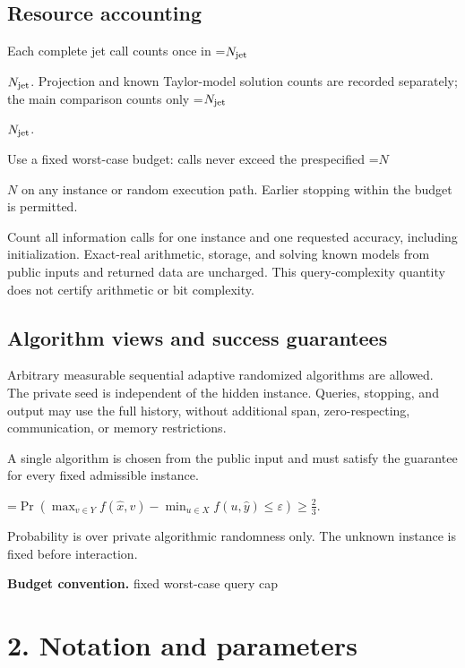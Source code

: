 \documentclass[10pt,a4paper]{article}
\newcommand{\AtlasMath}[1]{\par\begingroup\centering\setbox0=\hbox{$\displaystyle #1$}\ifdim\wd0>1.4\linewidth\typeout{ATLAS WIDE FORMULA: \the\wd0}\fi\ifdim\wd0>\linewidth\resizebox{\linewidth}{!}{\box0}\else\box0\fi\par\endgroup}
\newcommand{\AtlasInlineMath}[1]{\begingroup\setbox0=\hbox{$#1$}\ifdim\wd0>.4\linewidth\endgroup\AtlasMath{#1}\else\endgroup$#1$\fi}
\begin{document}
\subsection{Resource accounting}


Each complete jet call counts once in \AtlasInlineMath{N_{\rm jet}}. Projection and known Taylor-model solution counts are recorded separately; the main comparison counts only \AtlasInlineMath{N_{\rm jet}}.



Use a fixed worst-case budget: calls never exceed the prespecified \AtlasInlineMath{N} on any instance or random execution path. Earlier stopping within the budget is permitted.



Count all information calls for one instance and one requested accuracy, including initialization. Exact-real arithmetic, storage, and solving known models from public inputs and returned data are uncharged. This query-complexity quantity does not certify arithmetic or bit complexity.



\subsection{Algorithm views and success guarantees}


Arbitrary measurable sequential adaptive randomized algorithms are allowed. The private seed is independent of the hidden instance. Queries, stopping, and output may use the full history, without additional span, zero-respecting, communication, or memory restrictions.



A single algorithm is chosen from the public input and must satisfy the guarantee for every fixed admissible instance.




\AtlasMath{\Pr\!\left(\max_{v\in Y}f(\widehat{x},v)-\min_{u\in X}f(u,\widehat{y})\le\varepsilon\right)\ge\frac23.}




Probability is over private algorithmic randomness only. The unknown instance is fixed before interaction.



\textbf{Budget convention.} fixed worst-case query cap



\section{2. Notation and parameters}
\end{document}
